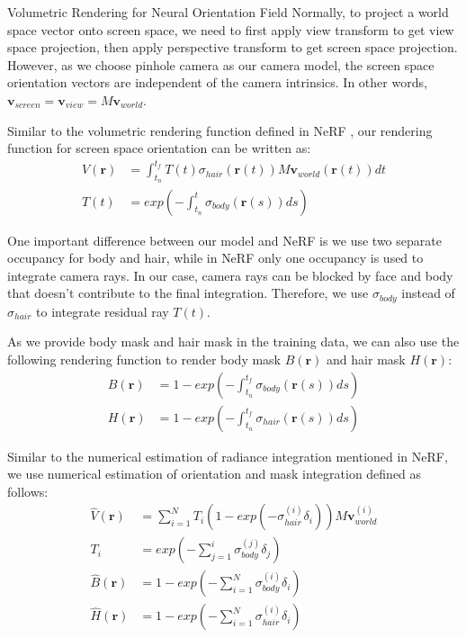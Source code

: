 \documentclass[final]{beamer}
\newlength{\colwidth}
\begin{document}
\begin{frame}[t]
\begin{columns}[t]
\begin{column}{\colwidth}
\begin{alertblock}{Volumetric Rendering for Neural Orientation Field}
    Normally, to project a world space vector onto screen space, we need to first apply view transform to get view space projection, then apply perspective transform to get screen space projection. However, as we choose pinhole camera as our camera model, the screen space orientation vectors are independent of the camera intrinsics. In other words, $\mathbf{v}_{screen} = \mathbf{v}_{view} = M\mathbf{v}_{world}$.
    
    Similar to the volumetric rendering function defined in NeRF \cite{mildenhall_nerf_2020}, our rendering function for screen space orientation can be written as:
    \begin{align}
    	V(\mathbf{r}) & = \int_{t_{n}}^{t_{f}} T(t) \sigma_{hair}(\mathbf{r}(t)) M \mathbf{v}_{world}(\mathbf{r}(t)) dt \\
    	T(t) & = exp(-\int_{t_{n}}^{t} \sigma_{body}(\mathbf{r}(s)) ds)
    \end{align}
    
    One important difference between our model and NeRF is we use two separate occupancy for body and hair, while in NeRF only one occupancy is used to integrate camera rays. In our case, camera rays can be blocked by face and body that doesn't contribute to the final integration. Therefore, we use $\sigma_{body}$ instead of $\sigma_{hair}$ to integrate residual ray $T(t)$.
    
    As we provide body mask and hair mask in the training data, we can also use the following rendering function to render body mask $B(\mathbf{r})$ and hair mask $H(\mathbf{r})$:
    \begin{align}
    	B(\mathbf{r}) & = 1 - exp(-\int_{t_{n}}^{t_{f}} \sigma_{body}(\mathbf{r}(s)) ds) \\
    	H(\mathbf{r}) & = 1 - exp(-\int_{t_{n}}^{t_{f}} \sigma_{hair}(\mathbf{r}(s)) ds)
    \end{align}
    
    Similar to the numerical estimation of radiance integration mentioned in NeRF, we use numerical estimation of orientation and mask integration defined as follows:
    \begin{align}
    	\hat{V}(\mathbf{r}) & = \sum_{i=1}^{N} T_{i} (1 - exp(-\sigma_{hair}^{(i)} \delta_{i})) M \mathbf{v}_{world}^{(i)} \\
    	T_{i} & = exp(-\sum_{j=1}^{i} \sigma_{body}^{(j)} \delta_{j}) \\
    	\hat{B}(\mathbf{r}) & = 1 - exp(-\sum_{i=1}^{N} \sigma_{body}^{(i)} \delta_{i}) \\
    	\hat{H}(\mathbf{r}) & = 1 - exp(-\sum_{i=1}^{N} \sigma_{hair}^{(i)} \delta_{i})
    \end{align}
    

\end{alertblock}
\end{column}
\end{columns}
\end{frame}
\end{document}
